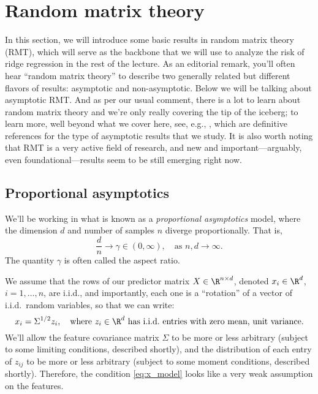 \documentclass{article}
\begin{document}
\section{Random matrix theory}

In this section, we will introduce some basic results in random matrix theory
(RMT), which will serve as the backbone that we will use to analyze the risk of
ridge regression in the rest of the lecture. As an editorial remark, you'll
often hear ``random matrix theory'' to describe two generally related but
different flavors of results: asymptotic and non-asymptotic. Below we will be
talking about asymptotic RMT. And as per our usual comment, there is a lot to 
learn about random matrix theory and we're only really covering the tip of the
iceberg; to learn more, well beyond what we cover here, see, e.g.,
\citet{tulino2004random, bai2010spectral}, which are definitive references for
the type of asymptotic results that we study. It is also worth noting that RMT
is a very active field of research, and new and important---arguably, even
foundational---results seem to be still emerging right now.   

\subsection{Proportional asymptotics}

We'll be working in what is known as a \emph{proportional asymptotics} model,
where the dimension $d$ and number of samples $n$ diverge proportionally. That 
is,
\[
\frac{d}{n} \to \gamma \in (0,\infty), \quad \text{as $n,d \to \infty$}. 
\]
The quantity $\gamma$ is often called the aspect ratio.

We assume that the rows of our predictor matrix $X \in \R^{n \times d}$, denoted 
$x_i \in \R^d$, $i=1,\dots,n$, are i.i.d., and importantly, each one is a
``rotation'' of a vector of i.i.d.\ random variables, so that we can write:   
\begin{equation}
\label{eq:x_model}
x_i = \Sigma^{1/2} z_i, \quad \text{where $z_i \in \R^d$ has i.i.d.\ entries
  with zero mean, unit variance.} 
\end{equation}
We'll allow the feature covariance matrix $\Sigma$ to be more or less arbitrary 
(subject to some limiting conditions, described shortly), and the distribution
of each entry of $z_{ij}$ to be more or less arbitrary (subject to some moment
conditions, described shortly). Therefore, the condition \eqref{eq:x_model}
looks like a very weak assumption on the features.  
\end{document}
